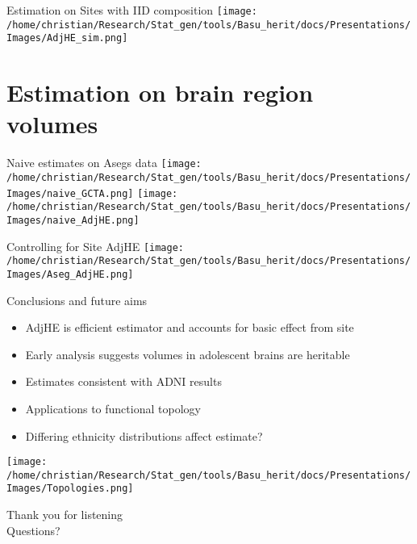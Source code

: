 \documentclass[
  ignorenonframetext,
]{beamer}
\begin{document}
\begin{frame}{Estimation on Sites with IID composition}
\centering
\texttt{[image: /home/christian/Research/Stat\_gen/tools/Basu\_herit/docs/Presentations/Images/AdjHE\_sim.png]}
\end{frame}

\section{Estimation on brain region volumes}
\begin{frame}{Naive estimates on Asegs data}
\texttt{[image: /home/christian/Research/Stat\_gen/tools/Basu\_herit/docs/Presentations/Images/naive\_GCTA.png]}
\texttt{[image: /home/christian/Research/Stat\_gen/tools/Basu\_herit/docs/Presentations/Images/naive\_AdjHE.png]}


\end{frame}


\begin{frame}{Controlling for Site AdjHE}
\texttt{[image: /home/christian/Research/Stat\_gen/tools/Basu\_herit/docs/Presentations/Images/Aseg\_AdjHE.png]}

\end{frame}






\begin{frame}{Conclusions and future aims}
\begin{itemize}
	\item AdjHE is efficient estimator and accounts for basic effect from site
	\item Early analysis suggests volumes in adolescent brains are heritable
	\item Estimates consistent with ADNI results
	\item Applications to functional topology
	\item Differing ethnicity distributions affect estimate?
\end{itemize}
\centering
\texttt{[image: /home/christian/Research/Stat\_gen/tools/Basu\_herit/docs/Presentations/Images/Topologies.png]}

\end{frame}


\begin{frame}
\begin{Huge}
Thank you for listening \\
Questions?
\end{Huge}
\end{frame}
\end{document}
